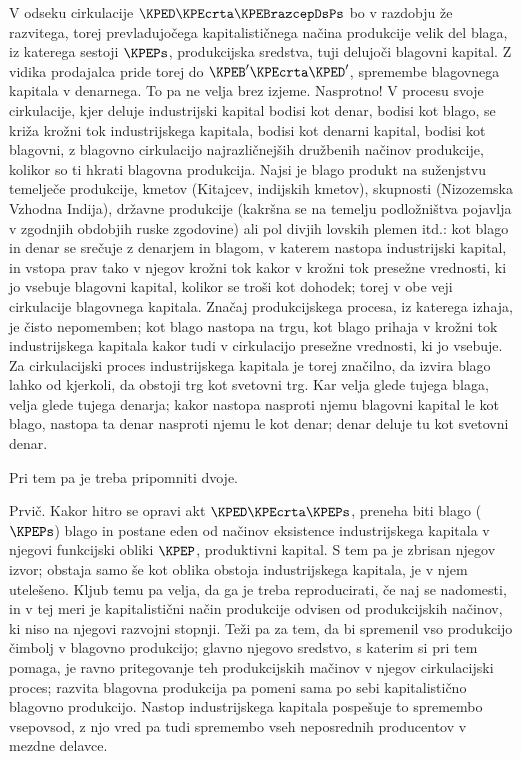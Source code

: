 \documentclass[kapital_02.tex]{subfiles}
\begin{document}
V odseku cirkulacije \( \KPED \KPEcrta \KPEBrazcepDsPs \) bo v razdobju že razvitega, torej prevladujočega kapitalističnega načina produkcije velik del blaga, iz katerega sestoji  \( \KPEPs \), produkcijska sredstva, tuji delujoči blagovni kapital. Z vidika prodajalca pride torej do \( \KPEB' \KPEcrta \KPED' \), spremembe blagovnega kapitala v denarnega. To pa ne velja brez izjeme. Nasprotno! V procesu svoje cirkulacije, kjer deluje industrijski kapital bodisi kot denar, bodisi kot blago, se križa krožni tok industrijskega kapitala, bodisi kot denarni kapital, bodisi kot blagovni, z blagovno cirkulacijo najrazličnejših družbenih načinov produkcije, kolikor so ti hkrati blagovna produkcija. Najsi je blago produkt na suženjstvu temelječe produkcije, kmetov (Kitajcev, indijskih kmetov), skupnosti (Nizozemska Vzhodna Indija), državne produkcije (kakršna se na temelju podložništva pojavlja v zgodnjih obdobjih ruske zgodovine) ali pol divjih lovskih plemen itd.: kot blago in denar se srečuje z denarjem in blagom, v katerem nastopa industrijski \KPEstran kapital, in vstopa prav tako v njegov krožni tok kakor v krožni tok presežne vrednosti, ki jo vsebuje blagovni kapital, kolikor se troši kot dohodek; torej v obe veji cirkulacije blagovnega kapitala. Značaj produkcijskega procesa, iz katerega izhaja, je čisto nepomemben; kot blago nastopa na trgu, kot blago prihaja v krožni tok industrijskega kapitala kakor tudi v cirkulacijo presežne vrednosti, ki jo vsebuje. Za cirkulacijski proces industrijskega kapitala je torej značilno, da izvira blago lahko od kjerkoli, da obstoji trg kot svetovni trg. Kar velja glede tujega blaga, velja glede tujega denarja; kakor nastopa nasproti njemu blagovni kapital le kot blago, nastopa ta denar nasproti njemu le kot denar; denar deluje tu kot svetovni denar.

Pri tem pa je treba pripomniti dvoje.

Prvič. Kakor hitro se opravi akt  \( \KPED \KPEcrta \KPEPs \), preneha biti blago (\( \KPEPs \)) blago in postane eden od načinov eksistence industrijskega kapitala v njegovi funkcijski obliki \( \KPEP \), produktivni kapital. S tem pa je zbrisan njegov izvor; obstaja samo še kot oblika obstoja industrijskega kapitala, je v njem utelešeno. Kljub temu pa velja, da ga je treba reproducirati, če naj se nadomesti, in v tej meri je kapitalistični način produkcije odvisen od produkcijskih načinov, ki niso na njegovi razvojni stopnji. Teži pa za tem, da bi spremenil vso produkcijo čimbolj v blagovno produkcijo; glavno njegovo sredstvo, s katerim si pri tem pomaga, je ravno pritegovanje teh produkcijskih mačinov v njegov cirkulacijski proces; razvita blagovna produkcija pa pomeni sama po sebi kapitalistično blagovno produkcijo. Nastop industrijskega kapitala pospešuje to spremembo vsepovsod, z njo vred pa tudi spremembo vseh neposrednih producentov v mezdne delavce.
\end{document}
